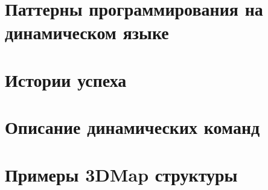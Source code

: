 \documentclass[14pt]{extbook}
\begin{document}
    
    
    

	\chapter{Паттерны программирования на динамическом языке}
    
    
    \chapter{Истории успеха}
    

    \appendix
    \setcounter{secnumdepth}{0}
    
    \chapter{Описание динамических команд}\label{apx:dlib_doc}
    

    \chapter{Примеры 3DMap структуры}\label{apx:3dmap}
    

    \clearpage
    \printglossaries 
\end{document}

